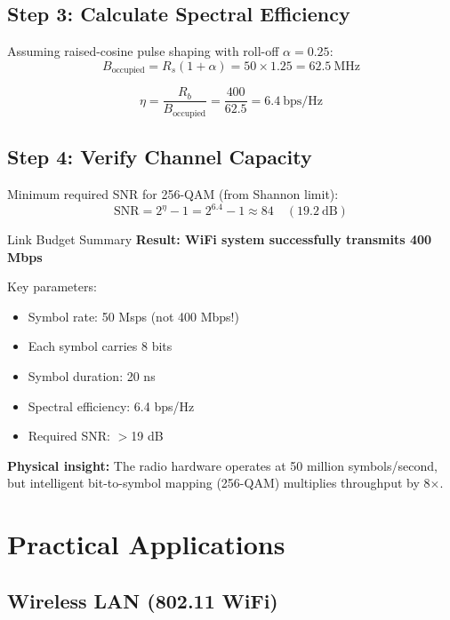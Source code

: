 \subsection*{Step 3: Calculate Spectral Efficiency}

Assuming raised-cosine pulse shaping with roll-off $\alpha = 0.25$:
\begin{equation}
B_{\text{occupied}} = R_s(1 + \alpha) = 50 \times 1.25 = 62.5\ \text{MHz}
\end{equation}

\begin{equation}
\eta = \frac{R_b}{B_{\text{occupied}}} = \frac{400}{62.5} = 6.4\ \text{bps/Hz}
\end{equation}

\subsection*{Step 4: Verify Channel Capacity}

Minimum required SNR for 256-QAM (from Shannon limit):
\begin{equation}
\text{SNR} = 2^{\eta} - 1 = 2^{6.4} - 1 \approx 84 \quad (19.2\ \text{dB})
\end{equation}

\begin{calloutbox}[colback=black!8!white,colframe=black]{Link Budget Summary}
\textbf{Result: WiFi system successfully transmits 400 Mbps}

Key parameters:
\begin{itemize}
\item Symbol rate: 50 Msps (not 400 Mbps!)
\item Each symbol carries 8 bits
\item Symbol duration: 20 ns
\item Spectral efficiency: 6.4 bps/Hz
\item Required SNR: $>$19 dB
\end{itemize}

\textbf{Physical insight:} The radio hardware operates at 50 million symbols/second, but intelligent bit-to-symbol mapping (256-QAM) multiplies throughput by 8$\times$.
\end{calloutbox}

\section{Practical Applications}

\subsection{Wireless LAN (802.11 WiFi)}

